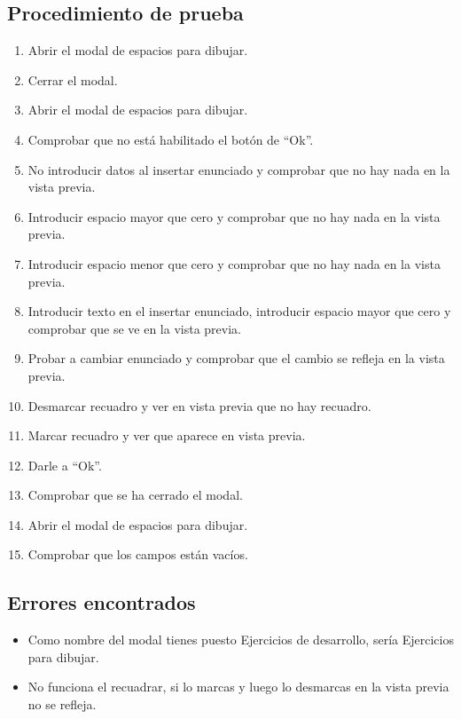 \subsection{Procedimiento de prueba}
\label{procedimientoPruebas:dibujar}
\begin{enumerate}
    \item Abrir el modal de espacios para dibujar.
    \item Cerrar el modal.
    \item Abrir el modal de espacios para dibujar.
    \item Comprobar que no está habilitado el botón de ``Ok''.
    \item No introducir datos al insertar enunciado y comprobar que no hay nada en la vista previa.
    \item Introducir espacio mayor que cero y comprobar que no hay nada en la vista previa.
    \item Introducir espacio menor que cero y comprobar que no hay nada en la vista previa.
    \item Introducir texto en el insertar enunciado, introducir espacio mayor que cero y comprobar que se ve en la vista previa.
    \item Probar a cambiar enunciado y comprobar que el cambio se refleja en la vista previa.
    \item Desmarcar recuadro y ver en vista previa que no hay recuadro.
    \item Marcar recuadro y ver que aparece en vista previa.
    \item Darle a ``Ok''.
    \item Comprobar que se ha cerrado el modal.
    \item Abrir el modal de espacios para dibujar.
    \item Comprobar que los campos están vacíos.
\end{enumerate}

\subsection{Errores encontrados}
\label{errores:espacio}
\begin{itemize}
    \item  Como nombre del modal tienes puesto Ejercicios de desarrollo, sería Ejercicios para dibujar.
    \item No funciona el recuadrar, si lo marcas y luego lo desmarcas en la vista previa no se refleja.
\end{itemize}

